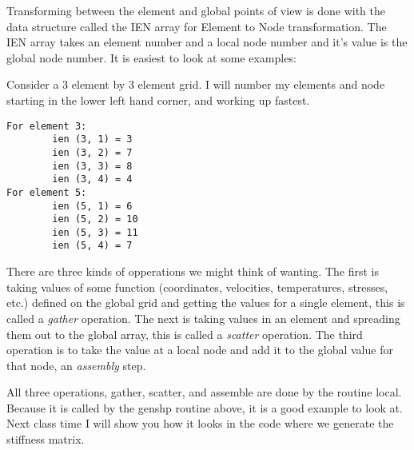 \documentclass{article}
\begin{document}
Transforming between the element and global points of view is done
with the data structure called the IEN array for Element to Node 
transformation.    The IEN array takes an element number and a local node
number and it's value is the global node number.   It is easiest to look at
some examples:

Consider a 3 element by 3 element grid.  I will number my elements and node
starting in the lower left hand corner, and working up fastest.   

\begin{verbatim}
For element 3:
        ien (3, 1) = 3 
        ien (3, 2) = 7
        ien (3, 3) = 8
        ien (3, 4) = 4
For element 5:
        ien (5, 1) = 6
        ien (5, 2) = 10
        ien (5, 3) = 11
        ien (5, 4) = 7
\end{verbatim}

There are three kinds of opperations we might think of wanting.  The first is
taking  values of some function (coordinates, velocities, temperatures,
stresses, etc.) defined on the global grid and getting the values for a single
element, this is called a {\em gather} operation.  The next is taking values in
an element and spreading them out to the global array, this is called a {\em
scatter} operation.  The third operation is to take the value at a local node
and add it to the global value for that node, an {\em assembly} step.

All three operations, gather, scatter, and assemble are done by the routine
local.   Because it is called by the genshp routine above, it is a good example
to look at.   Next class time I will show you how it looks in the code where we
generate the stiffness matrix.
\end{document}
